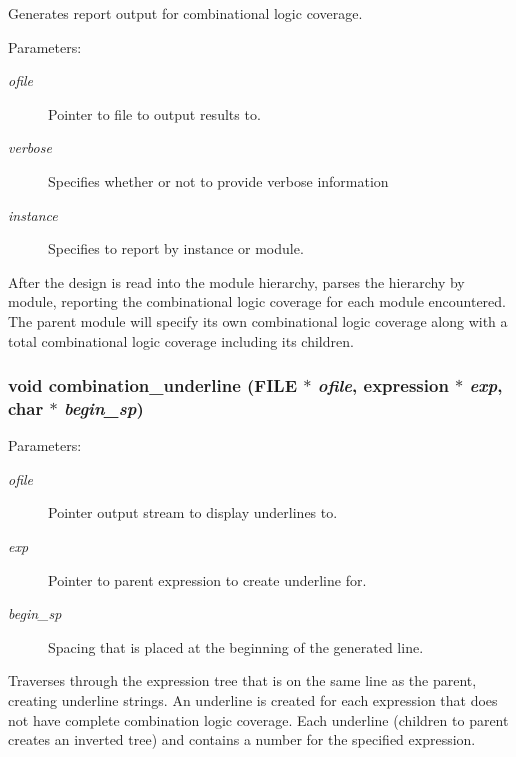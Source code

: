 Generates report output for combinational logic coverage.

\begin{Desc}
\item[Parameters: ]\par
\begin{description}
\item[{\em 
ofile}]Pointer to file to output results to. \item[{\em 
verbose}]Specifies whether or not to provide verbose information \item[{\em 
instance}]Specifies to report by instance or module.\end{description}
\end{Desc}
After the design is read into the module hierarchy, parses the hierarchy by module, reporting the combinational logic coverage for each module encountered. The parent  module will specify its own combinational logic coverage along with a total combinational logic coverage including its children. 
\subsubsection{\setlength{\rightskip}{0pt plus 5cm}void combination\_\-underline (FILE $\ast$ {\em ofile}, {\bf expression} $\ast$ {\em exp}, char $\ast$ {\em begin\_\-sp})}\label{comb_8c_a7}


\begin{Desc}
\item[Parameters: ]\par
\begin{description}
\item[{\em 
ofile}]Pointer output stream to display underlines to. \item[{\em 
exp}]Pointer to parent expression to create underline for. \item[{\em 
begin\_\-sp}]Spacing that is placed at the beginning of the generated line.\end{description}
\end{Desc}
Traverses through the expression tree that is on the same line as the parent, creating underline strings. An underline is created for each expression that does not have complete combination logic coverage. Each underline (children to parent creates an inverted tree) and contains a number for the specified expression. 
